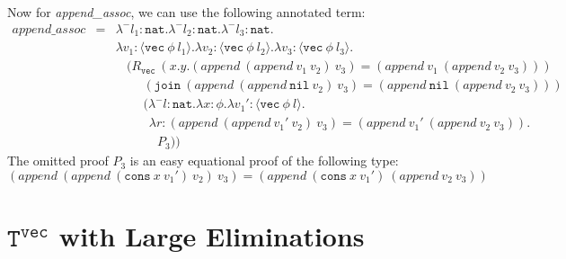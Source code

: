 \documentclass[copyright]{eptcs}
\newcommand{\vc}[0]{\texttt{vec}}
\newcommand{\nat}[0]{\texttt{nat}}
\newcommand{\Tvec}[0]{\texttt{T}^\vc}
\newcommand{\nil}[0]{\texttt{nil}}
\newcommand{\cons}[0]{\texttt{cons}}
\newcommand{\join}[0]{\texttt{join}}
\begin{document}
\noindent Now for \textit{append\_assoc}, we can use the following annotated term:
{\small
\[
\begin{array}{lll}
\textit{append\_assoc} &=& \lambda^- l_1:\nat. \lambda^- l_2:\nat.\lambda^- l_3:\nat. \\
\ &\ &\lambda v_1:\langle \vc\ \phi\ l_1\rangle. \lambda v_2:\langle \vc\ \phi\ l_2\rangle. \lambda v_3:\langle \vc\ \phi\ l_3\rangle.\\
\ &\ &\ \ \ \ (R_\vc\ (x.y.(\textit{append}\ (\textit{append}\ v_1\ v_2)\ v_3) = (\textit{append}\ v_1\ (\textit{append}\ v_2\ v_3)))\ \\
\ &\ &\ \ \ \ \ \ \ \ \ \ (\join\ (\textit{append}\ (\textit{append}\ \nil\ v_2)\ v_3) = (\textit{append}\ \nil\ (\textit{append}\ v_2\ v_3))) \\
\ &\ &\ \ \ \ \ \ \ \ \ \ (\lambda^- l:\nat. \lambda x:\phi.\lambda v_1':\langle\vc\ \phi\ l\rangle.\\
\ &\ &\ \ \ \ \ \ \ \ \ \ \ \ \lambda r:(\textit{append}\ (\textit{append}\ v_1'\ v_2)\ v_3) = (\textit{append}\ v_1'\ (\textit{append}\ v_2\ v_3)).\\
\ &\ &\ \ \ \ \ \ \ \ \ \ \ \ \ \ \ P_3))
\end{array}
\]}
\noindent The omitted proof $P_3$ is an easy equational proof of the following type:
\[
(\textit{append}\ (\textit{append}\ (\cons\ x\ v_1')\ v_2)\ v_3) = (\textit{append}\ (\cons\ x\ v_1')\ (\textit{append}\ v_2\ v_3))
\]

\section{$\Tvec$ with Large Eliminations}
\label{sec:tveclarge}
\end{document}
